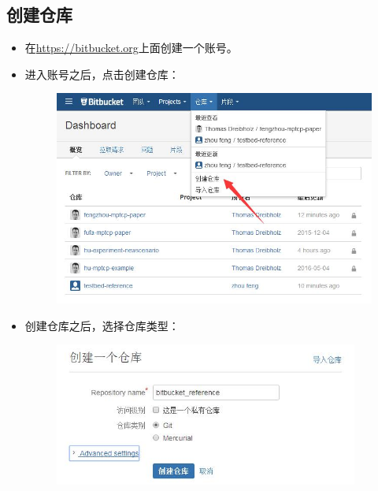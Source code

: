 \documentclass[a4paper,12pt]{ctexbook}
\begin{document}
\begin{flushleft}
\chapter{创建仓库}
\begin{itemize}
  \item 在\url{https://bitbucket.org}上面创建一个账号。
  \item 进入账号之后，点击创建仓库：
        \begin{figure}[H]
        \centering
        \includegraphics[width=15cm]{figures/create_reponsity.jpg}
        \end{figure}

  \item 创建仓库之后，选择仓库类型：
        \begin{figure}[H]
        \centering
        \includegraphics[width=10cm]{figures/create_reponsity_2.jpg}
        \end{figure}


\end{itemize}
\end{flushleft}
\end{document}
